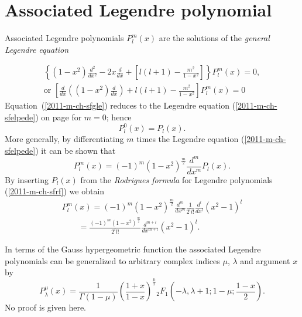 \section{Associated Legendre polynomial}

Associated Legendre polynomials $P_l^m(x)$ are the solutions of the
{\em general Legendre equation}

\begin{equation}
\begin{split}
\left\{
(1-x^2)\frac{d^2}{dx^2}
-2x  \frac{d }{dx }
+
\left[ l(l+1)-\frac{m^2}{1-x^2} \right] \right\} P_l^m(x)= 0,
\\
\textrm{or } \left[  \frac{d }{dx }\left((1-x^2)\frac{d }{dx }\right)
+
 l(l+1)-\frac{m^2}{1-x^2} \right]  P_l^m(x)= 0
\end{split}
\label{2011-m-ch-sfgle}
\end{equation}
Equation~(\ref{2011-m-ch-sfgle})
reduces to the Legendre equation
 (\ref{2011-m-ch-sfelpede})
on page \pageref{2011-m-ch-sfelpede} for  $m=0$;
hence
\begin{equation}
P_l^0(x)=P_l(x).
\end{equation}
More generally,
by differentiating $m$ times the Legendre equation (\ref{2011-m-ch-sfelpede})
it can be shown that
\begin{equation}
P_l^m(x)=(-1)^m(1-x^2)^\frac{m}{2} \frac{d^m}{dx^m}P_l(x).
\end{equation}
By inserting $P_l(x)$ from the
{\em Rodrigues formula}
for Legendre polynomials (\ref{2011-m-ch-sfrf})
we obtain
\begin{equation}
\begin{split}
P_l^m(x)=
(-1)^m(1-x^2)^\frac{m}{2} \frac{d^m}{dx^m} \frac{1}{2^ll!}\frac{d^l}{dx^l}(x^2-1)^l
\\
\qquad
=
\frac{(-1)^m(1-x^2)^\frac{m}{2}}{2^ll!} \frac{d^{m+l}}{dx^{m+l}}(x^2-1)^l
.
\end{split}
\end{equation}

In terms of the Gauss hypergeometric function
the associated Legendre polynomials can be generalized to
arbitrary complex indices $\mu$, $\lambda$ and argument $x$ by
\begin{equation}
P^\mu_\lambda (x) =
\frac{1}{\Gamma (1-\mu )}\left(\frac{1+x}{1-x}\right)^\frac{\mu}{2}
{}_2F_1
\left(
-\lambda , \lambda  +1; 1-\mu ;\frac{1-x}{2}
\right).
\end{equation}
No proof is given here.

